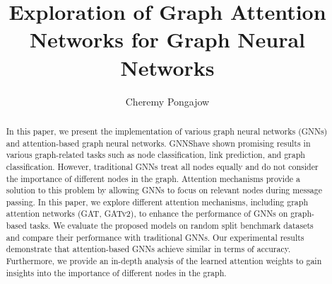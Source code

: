 \documentclass[runningheads]{llncs}
\begin{document}
%
%
\author{Cheremy Pongajow}
%
%

\title{Exploration of Graph Attention Networks for Graph Neural Networks}
%
\maketitle              %
%
\begin{abstract}
In this paper, we present the implementation of various graph neural networks (GNNs) and
attention-based graph neural networks. GNNShave shown
promising results in various graph-related tasks such as node classification, 
link prediction, and graph classification. However, traditional GNNs treat all 
nodes equally and do not consider the importance of different nodes in the graph. 
Attention mechanisms provide a solution to this problem by allowing GNNs to focus 
on relevant nodes during message passing. In this paper, we explore different attention 
mechanisms, including graph attention networks (GAT, GATv2), to enhance the performance of GNNs 
on graph-based tasks. We evaluate the proposed models on random split benchmark datasets and compare 
their performance with traditional GNNs. Our experimental results demonstrate that attention-based 
GNNs achieve similar in terms of accuracy. Furthermore, 
we provide an in-depth analysis of the learned attention weights to gain insights into 
the importance of different nodes in the graph. 

\end{abstract}
%
%
%
\end{document}
